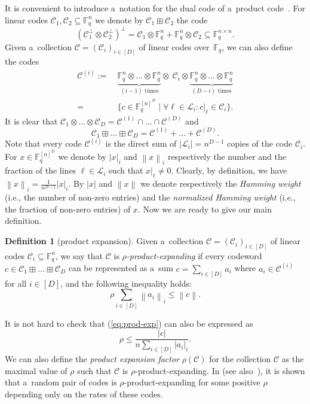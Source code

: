 \documentclass[conference]{IEEEtran}
\let\le\leqslant
\theoremstyle{plain}
\theoremstyle{definition}
\newtheorem{definition}[theorem]{Definition}
\theoremstyle{remark}
\newcommand{\abs}[1]{\left\lvert #1 \right\rvert}
\newcommand{\norm}[1]{\left\lVert#1\right\rVert}
\newcommand{\cC}{\mathcal{C}}
\newcommand{\cL}{\mathcal{L}}
\newcommand{\F}{\mathbb{F}}
\begin{document}
It is convenient to introduce a~notation for the dual code of a~product code~\cite{Wolf:1965, Chien:1973}. For linear codes $\cC_1,\cC_2\subseteq \F_q^{n}$ we denote by $\cC_1\boxplus \cC_2$ the code 
\[(\cC_1^\bot\otimes \cC_2^\bot)^\bot=\cC_1\otimes \F_q^{n}+\F_q^{n}\otimes \cC_2 \subseteq \F_q^{n\times n}.\]
Given a~collection $\cC = (\cC_i)_{i\in [D]}$ of linear codes over~$\F_q$, we can also define the codes 
\begin{align*}
\cC^{(i)} :=&\ \underbrace{\F_q^{n} \otimes\dots \otimes \F_q^{n}}_{(i-1) \text{ times}} \otimes \ \cC_i \otimes \underbrace{\F_q^{n}\otimes \dots\otimes \F_q^{n}}_{(D-i)\text{ times}} \\
=&\ \{ c\in \F_q^{[n]^D} \mid \forall \ell\in \cL_i\colon c|_\ell\in  \cC_i \}.    
\end{align*}
It is clear that $\cC_1\otimes \dots \otimes \cC_D = \cC^{(1)}\cap \dots \cap \cC^{(D)}$ and 
\[\cC_1\boxplus \dots \boxplus \cC_D = \cC^{(1)}+ \dots + \cC^{(D)}.\] Note that every code $\cC^{(i)}$ is the direct sum of $|\cL_i| = n^{D-1}$ copies of the code $\cC_i$. For $x\in \F_q^{[n]^D}$ we denote by $|x|_i$ and $\norm{x}_i$ respectively the number and the fraction of the lines ${\ell\in\cL_i}$ such that $x|_\ell \ne 0$. Clearly, by definition, we have $\norm{x}_i = \frac{1}{n^{D-1}}|x|_i$. By $|x|$ and $\norm{x}$ we denote respectively the \emph{Hamming weight} (i.e., the number of non-zero entries) and the \emph{normalized Hamming weight} (i.e., the fraction of non-zero entries) of $x$. Now we are ready to give our main definition. 

\begin{definition}[product expansion]
Given a~collection $\cC = (\cC_i)_{i\in [D]}$ of linear codes $\cC_i\subseteq \F_q^{n}$, we say that $\cC$ is \emph{$\rho$-product-expanding} if every codeword $c\in \cC_1\boxplus \dots \boxplus \cC_D$ can be represented as a~sum $c = \sum_{i\in[D]} a_i$ where $a_i\in \cC^{(i)}$ for all $i\in [D]$, and the following inequality holds:
\begin{equation}\label{eq:prod-exp}
\rho\sum_{i\in [D]} \norm{a_i}_i \le \norm{c} .    
\end{equation}
\end{definition}

It is not hard to check that (\ref{eq:prod-exp}) can also be expressed as
\begin{equation}\label{eq:prod-exp2}
\rho \le  \frac{\abs{c}}{n\sum_{i\in [D]} \abs{a_i}_i}.    
\end{equation}
We can also define the \emph{product expansion factor} $\rho(\cC)$ for the collection $\cC$ as the maximal value of $\rho$ such that $\cC$ is $\rho$-product-expanding. In \cite{kalachevTwosidedRobustlyTestable2023} (see also~\cite{Dinur:decoders}), it is shown that a~random pair of codes is $\rho$-product-expanding for some positive $\rho$ depending only on the rates of these codes.    
\end{document}
